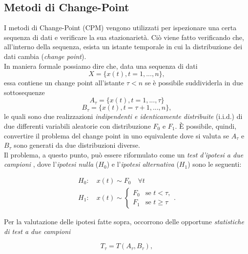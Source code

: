 \subsection{Metodi di Change-Point}
I metodi di Change-Point (CPM) vengono utilizzati per ispezionare una certa sequenza di dati e verificare la sua stazionariet\`a. Ci\`o viene fatto verificando che, all'interno della sequenza, esista un istante temporale in cui la distribuzione dei dati cambia (\textit{change point}).\\
In maniera formale possiamo dire che, data una sequenza di dati
\cite{alippi2014intelligence,ross2011nonparametric}
\[X=\{x(t), t = 1,...,n\},\]
essa contiene un change point all'istante $\tau < n$ se \`e possibile
suddividerla in due sottosequenze
\[ A_\tau = \{x(t), t = 1,...,\tau \}\]
\[ B_\tau = \{x(t), t = \tau + 1,...,n \},\]
le quali sono due realizzazioni \textit{indipendenti e identicamente
  distribuite} (i.i.d.) di due differenti variabili aleatorie con
distribuzione $ F_0 $ e $ F_1 $.
\`E possibile, quindi,  convertire il problema del change point in uno equivalente dove si valuta se $ A_\tau $ e $ B_\tau $ sono generati da due distribuzioni diverse.\\
Il problema, a questo punto, pu\`o essere riformulato come un
\textit{test d'ipotesi a due campioni} \cite{ross2009introduction},
dove l'\textit{ipotesi nulla} ($ H_0 $) e l'\textit{ipotesi
  alternativa} ($ H_1 $) sono le seguenti:
			
			\begin{eqnarray}
                          H_0: \quad  x(t) \sim F_0 \quad  \forall t \\
                          H_1: \quad  x(t) \sim 
                          \begin{cases}
                            F_{0} & \text{se } t < \tau, \\
                            F_{1} & \text{se } t \geq \tau
                          \end{cases}.
			\end{eqnarray}
			

			Per la valutazione delle ipotesi fatte sopra,
                        occorrono delle opportune \textit{statistiche
                          di test a due campioni}
                        \cite{ross2009introduction}
			
			\[ T_\tau = T(A_\tau, B_\tau), \]
			
